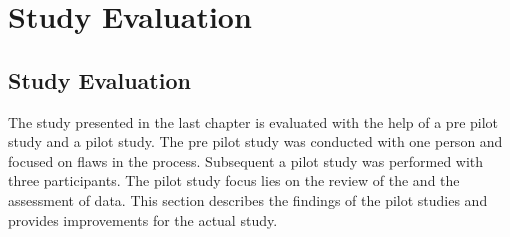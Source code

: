 \chapter{Study Evaluation}
\label{chapter:study_evaluation}
\section{Study Evaluation}
\label{sec:study_evaluation}
The study presented in the last chapter is evaluated with the help of a pre pilot study and a pilot study. The pre pilot study was conducted with one person and focused on flaws in the process. Subsequent a pilot study was performed with three participants. The pilot study focus lies on the review of the \exgo and the assessment of data. This section describes the findings of the pilot studies and provides improvements for the actual study.

